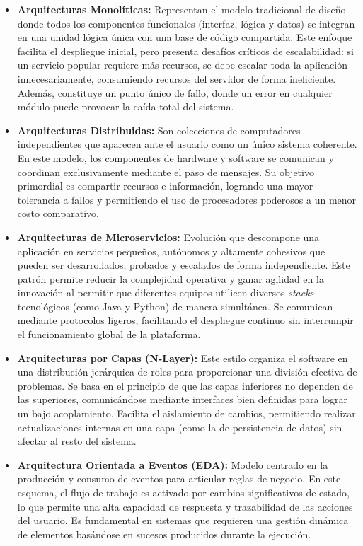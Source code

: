 \begin{itemize}
\item \textbf{Arquitecturas Monolíticas:} Representan el modelo tradicional de diseño donde todos los componentes funcionales (interfaz, lógica y datos) se integran en una unidad lógica única con una base de código compartida. Este enfoque facilita el despliegue inicial, pero presenta desafíos críticos de escalabilidad: si un servicio popular requiere más recursos, se debe escalar toda la aplicación innecesariamente, consumiendo recursos del servidor de forma ineficiente. Además, constituye un punto único de fallo, donde un error en cualquier módulo puede provocar la caída total del sistema.

\item \textbf{Arquitecturas Distribuidas:} Son colecciones de computadores independientes que aparecen ante el usuario como un único sistema coherente. En este modelo, los componentes de hardware y software se comunican y coordinan exclusivamente mediante el paso de mensajes. Su objetivo primordial es compartir recursos e información, logrando una mayor tolerancia a fallos y permitiendo el uso de procesadores poderosos a un menor costo comparativo.

\item \textbf{Arquitecturas de Microservicios:} Evolución que descompone una aplicación en servicios pequeños, autónomos y altamente cohesivos que pueden ser desarrollados, probados y escalados de forma independiente. Este patrón permite reducir la complejidad operativa y ganar agilidad en la innovación al permitir que diferentes equipos utilicen diversos \textit{stacks} tecnológicos (como Java y Python) de manera simultánea. Se comunican mediante protocolos ligeros, facilitando el despliegue continuo sin interrumpir el funcionamiento global de la plataforma.

\item \textbf{Arquitecturas por Capas (N-Layer):} Este estilo organiza el software en una distribución jerárquica de roles para proporcionar una división efectiva de problemas. Se basa en el principio de que las capas inferiores no dependen de las superiores, comunicándose mediante interfaces bien definidas para lograr un bajo acoplamiento. Facilita el aislamiento de cambios, permitiendo realizar actualizaciones internas en una capa (como la de persistencia de datos) sin afectar al resto del sistema.

\item \textbf{Arquitectura Orientada a Eventos (EDA):} Modelo centrado en la producción y consumo de eventos para articular reglas de negocio. En este esquema, el flujo de trabajo es activado por cambios significativos de estado, lo que permite una alta capacidad de respuesta y trazabilidad de las acciones del usuario. Es fundamental en sistemas que requieren una gestión dinámica de elementos basándose en sucesos producidos durante la ejecución.

\end{itemize}

